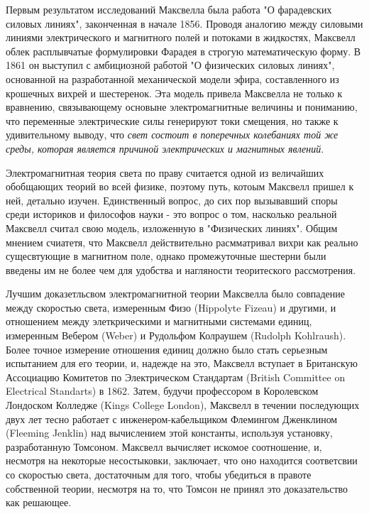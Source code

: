 \documentclass[12pt, oneside, a4paper]{article}
\begin{document}
Первым результатом исследований Максвелла была работа "О фарадевских силовых линиях", законченная в начале 1856. Проводя аналогию между силовыми линиями электрического и магнитного полей и потоками в жидкостях, Максвелл облек расплывчатые формулировки Фарадея в строгую математическую форму. В 1861 он выступил с амбициозной работой "О физических силовых линиях", основанной на разработанной механической модели эфира, составленного из крошечных вихрей и шестеренок. Эта модель привела Максвелла не только к вравнению, связывающему основыне электромагнитные величины и пониманию, что переменные электрические силы генерируют токи смещения, но также к удивительному выводу, что \emph{свет состоит в поперечных колебаниях той же среды, которая является причиной электрических и магнитных явлений}. 

Электромагнитная теория света по праву считается одной из величайших обобщающих теорий во всей физике, поэтому путь, котоым Максвелл пришел к ней, детально изучен. Единственный вопрос, до сих пор вызывавший споры среди историков и философов науки - это вопрос о том, насколько реальной Максвелл считал свою модель, изложенную в "Физических линиях". Общим мнением счиатетя, что Максвелл действительно расмматривал вихри как реально сущесвтующие в магнитном поле, однако промежуточные шестерни были введены им не более чем для удобства и нагляности теоритеского рассмотрения. 

Лучшим доказетльсвом электромагнитной теории Максвелла было совпадение между скоростью света, измеренным Физо (Hippolyte Fizeau) и другими, и отношением между элеткрическими и магнитными системами единиц, измеренным Вебером (Weber) и Рудольфом Колраушем (Rudolph Kohlraush). Более точное измерение отношения единиц должно было стать серьезным испытанием для его теории, и, надежде на это, Максвелл вступает в Британскую Ассоциацию Комитетов по Электрическом Стандартам (British Committee on Electrical Standarts) в 1862. Затем, будучи профессором в Королевском Лондоском Колледже (Kings College London), Максвелл в течении последующих двух лет тесно работает с инженером-кабельщиком Флемингом Дженклином (Fleeming Jenklin) над вычислением этой константы, используя установку, разработанную Томсоном. Максвелл вычисляет искомое соотношение, и, несмотря на некоторые несостыковки, заключает, что оно находится соответсвии со скоростью света, достаточным для того, чтобы убедиться в правоте собственной теории, несмотря на то, что Томсон не принял это доказательство как решающее. 
\end{document}
